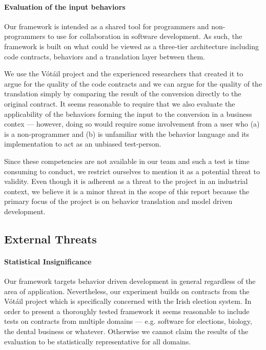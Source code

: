 \paragraph{Evaluation of the input behaviors}
Our framework is intended as a shared tool for programmers and non-programmers to use for collaboration in software development. As such, the framework is built on what could be viewed as a three-tier architecture including code contracts, behaviors and a translation layer between them.
 
We use the V\'{o}t\'{a}il project and the experienced researchers that created it to argue for the quality of the code contracts and we can argue for the quality of the translation simply by comparing the result of the conversion directly to the original contract. It seems reasonable to require that we also evaluate the applicability of the behaviors forming the input to the conversion in a business contex --- however, doing so would require some involvement from a user who (a) is a non-programmer and (b) is unfamiliar with the behavior language and its implementation to act as an unbiased test-person.

Since these competencies are not available in our team and such a test is time consuming to conduct, we restrict ourselves to mention it as a potential threat to validity. Even though it is adherent as a threat to the project in an industrial context, we believe it is a minor threat in the scope of this report because the primary focus of the project is on behavior translation and model driven development.

\subsection{External Threats}
\paragraph{Statistical Insignificance}
Our framework targets behavior driven development in general regardless of the area of application. Nevertheless, our experiment builds on contracts from the V\'{o}t\'{a}il project which is specifically concerned with the Irish election system. In order to present a thoroughly tested framework it seems reasonable to include tests on contracts from multiple domains --- e.g. software for elections, biology, the dental business or whatever. Otherwise we cannot claim the results of the evaluation to be statistically representative for all domains.
 
